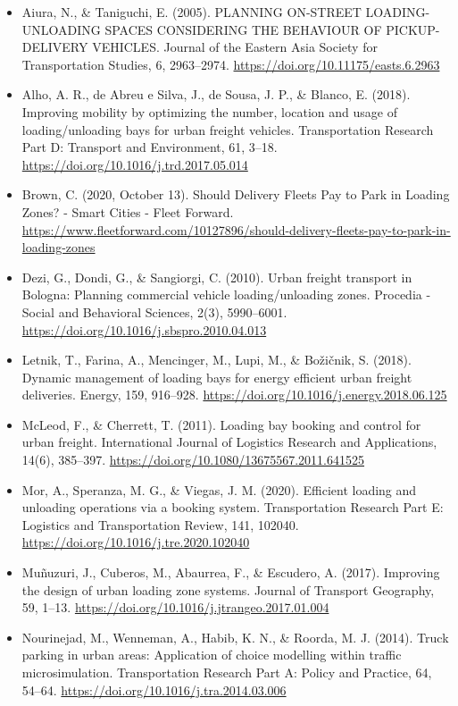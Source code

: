 \documentclass[
]{book}
\providecommand{\tightlist}{%
  \setlength{\itemsep}{0pt}\setlength{\parskip}{0pt}}
\begin{document}
\begin{itemize}
\tightlist
\item
  Aiura, N., \& Taniguchi, E. (2005). PLANNING ON-STREET LOADING-UNLOADING SPACES CONSIDERING THE BEHAVIOUR OF PICKUP-DELIVERY VEHICLES. Journal of the Eastern Asia Society for Transportation Studies, 6, 2963--2974. \url{https://doi.org/10.11175/easts.6.2963}
\item
  Alho, A. R., de Abreu e Silva, J., de Sousa, J. P., \& Blanco, E. (2018). Improving mobility by optimizing the number, location and usage of loading/unloading bays for urban freight vehicles. Transportation Research Part D: Transport and Environment, 61, 3--18. \url{https://doi.org/10.1016/j.trd.2017.05.014}
\item
  Brown, C. (2020, October 13). Should Delivery Fleets Pay to Park in Loading Zones? - Smart Cities - Fleet Forward. \url{https://www.fleetforward.com/10127896/should-delivery-fleets-pay-to-park-in-loading-zones}
\item
  Dezi, G., Dondi, G., \& Sangiorgi, C. (2010). Urban freight transport in Bologna: Planning commercial vehicle loading/unloading zones. Procedia - Social and Behavioral Sciences, 2(3), 5990--6001. \url{https://doi.org/10.1016/j.sbspro.2010.04.013}
\item
  Letnik, T., Farina, A., Mencinger, M., Lupi, M., \& Božičnik, S. (2018). Dynamic management of loading bays for energy efficient urban freight deliveries. Energy, 159, 916--928. \url{https://doi.org/10.1016/j.energy.2018.06.125}
\item
  McLeod, F., \& Cherrett, T. (2011). Loading bay booking and control for urban freight. International Journal of Logistics Research and Applications, 14(6), 385--397. \url{https://doi.org/10.1080/13675567.2011.641525}
\item
  Mor, A., Speranza, M. G., \& Viegas, J. M. (2020). Efficient loading and unloading operations via a booking system. Transportation Research Part E: Logistics and Transportation Review, 141, 102040. \url{https://doi.org/10.1016/j.tre.2020.102040}
\item
  Muñuzuri, J., Cuberos, M., Abaurrea, F., \& Escudero, A. (2017). Improving the design of urban loading zone systems. Journal of Transport Geography, 59, 1--13. \url{https://doi.org/10.1016/j.jtrangeo.2017.01.004}
\item
  Nourinejad, M., Wenneman, A., Habib, K. N., \& Roorda, M. J. (2014). Truck parking in urban areas: Application of choice modelling within traffic microsimulation. Transportation Research Part A: Policy and Practice, 64, 54--64. \url{https://doi.org/10.1016/j.tra.2014.03.006}

\end{itemize}
\end{document}
